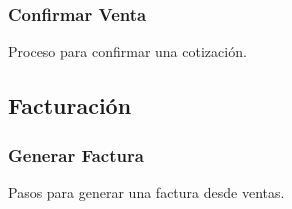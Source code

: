 \documentclass[12pt]{article}
\begin{document}
\subsubsection{Confirmar Venta}
Proceso para confirmar una cotización.

\subsection{Facturación}
\subsubsection{Generar Factura}
Pasos para generar una factura desde ventas.

\end{document}
